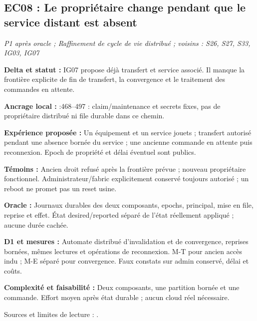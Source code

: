 \documentclass[11pt,a4paper]{article}
\newcommand{\code}[1]{{\small\ttfamily\path{#1}}}
\begin{document}
\par\noindent\begin{minipage}{\linewidth}\setlength{\parskip}{5pt}\subsection{EC08 : Le propriétaire change pendant que le service distant est absent}

\textit{P1 après oracle ; Raffinement de cycle de vie distribué ; voisins : S26, S27, S33, IG03, IG07}

\textbf{Delta et statut :} IG07 propose déjà transfert et service associé. Il manque la frontière explicite de fin de transfert, la convergence et le traitement des commandes en attente.\par\end{minipage}\par

{\small\textbf{Ancrage local :} \code{benchmark_simulator.py}:468--497 : claim/maintenance et secrets fixes, pas de propriétaire distribué ni file durable dans ce chemin.}

\textbf{Expérience proposée :} Un équipement et un service jouets ; transfert autorisé pendant une absence bornée du service ; une ancienne commande en attente puis reconnexion. Epoch de propriété et délai éventuel sont publics.

\textbf{Témoins :} Ancien droit refusé après la frontière prévue ; nouveau propriétaire fonctionnel. Administrateur/fabric explicitement conservé toujours autorisé ; un reboot ne promet pas un reset usine.

\textbf{Oracle :} Journaux durables des deux composants, epochs, principal, mise en file, reprise et effet. État desired/reported séparé de l'état réellement appliqué ; aucune durée cachée.

\textbf{D1 et mesures :} Automate distribué d'invalidation et de convergence, reprises bornées, mêmes lectures et opérations de reconnexion. M-T pour ancien accès indu ; M-E séparé pour convergence. Faux constats sur admin conservé, délai et coûts.

\textbf{Complexité et faisabilité :} Deux composants, une partition bornée et une commande. Effort moyen après état durable ; aucun cloud réel nécessaire.

Sources et limites de lecture : \cite{matter-acl,brski,shadow}.
\end{document}

